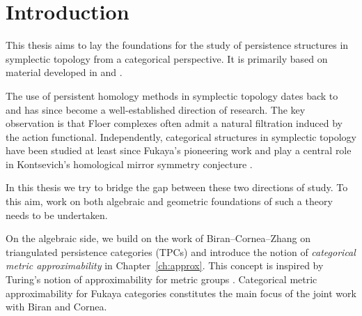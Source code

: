 
\chapter{Introduction}




This thesis aims to lay the foundations for the study of persistence structures in symplectic topology from a categorical perspective. It is primarily based on material developed in \cite{Amb:fil-fuk} and \cite{ABC26}. 

The use of persistent homology methods in symplectic topology dates back to \cite{Po-Sh:autonom-ham-flows} and has since become a well-established direction of research. The key observation is that Floer complexes often admit a natural filtration induced by the action functional. Independently, categorical structures in symplectic topology have been studied at least since Fukaya’s pioneering work \cite{Fu:Morse-homotopy} and play a central role in Kontsevich’s homological mirror symmetry conjecture \cite{Ko:ICM-HMS}. 

In this thesis we try to bridge the gap between these two directions of study. To this aim, work on both algebraic and geometric foundations of such a theory needs to be undertaken.

On the algebraic side, we build on the work of Biran--Cornea--Zhang \cite{BCZ:tpc} on triangulated persistence categories (TPCs) and introduce the notion of \emph{categorical metric approximability} in Chapter~\ref{ch:approx}. This concept is inspired by Turing’s notion of approximability for metric groups \cite{Turing:approx}. Categorical metric approximability for Fukaya categories constitutes the main focus of the joint work \cite{ABC26} with Biran and Cornea.

